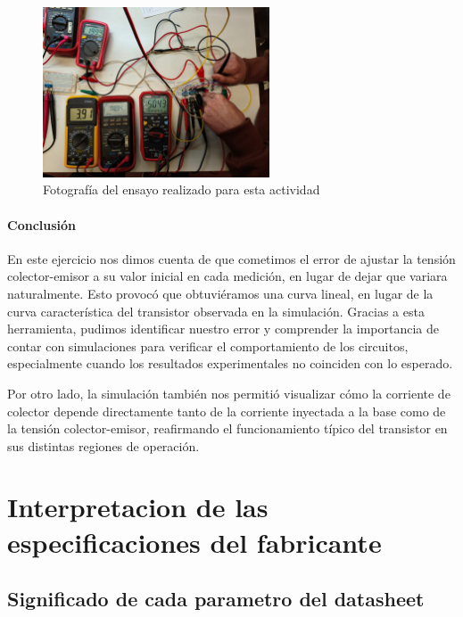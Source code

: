 \documentclass[chaptersright]{informeutn}
\begin{document}
    \begin{figure}[H]
        \centering
        \includegraphics[width=0.6\textwidth, keepaspectratio]{pictures/disposicion-beta.jpeg}
        \caption{Fotografía del ensayo realizado para esta actividad}
    \end{figure}

    \subsubsection{Conclusión}
     En este ejercicio nos dimos cuenta de que cometimos el error de ajustar la tensión colector-emisor a su valor 
     inicial en cada medición, en lugar de dejar que variara naturalmente. Esto provocó que obtuviéramos una curva 
     lineal, en lugar de la curva característica del transistor observada en la simulación. Gracias a esta herramienta,
     pudimos identificar nuestro error y comprender la importancia de contar con simulaciones para verificar el 
     comportamiento de los circuitos, especialmente cuando los resultados experimentales no coinciden con lo esperado.

     Por otro lado, la simulación también nos permitió visualizar cómo la corriente de colector depende directamente
     tanto de la corriente inyectada a la base como de la tensión colector-emisor, reafirmando el funcionamiento típico
     del transistor en sus distintas regiones de operación.

\chapter{Interpretacion de las especificaciones del fabricante}

\section{Significado de cada parametro del datasheet}
\end{document}
